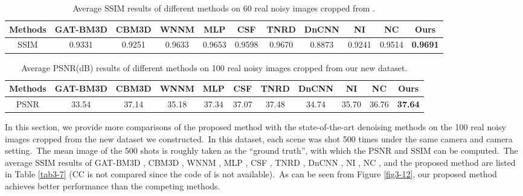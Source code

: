\begin{table}[htpb]
\begin{adjustwidth}{-1cm}{}
\scriptsize
\caption{Average SSIM \cite{ssim} results of different methods on 60 real noisy images cropped from \cite{crosschannel2016}.}
\label{tab3-5}
\begin{center}
\renewcommand\arraystretch{1}
\begin{tabular}{|c||c|c|c|c|c|c|c|c|c|c|}
\hline
Methods
&\textbf{GAT-BM3D}
&\textbf{CBM3D}
&\textbf{WNNM}
&\textbf{MLP}
&\textbf{CSF} 
&\textbf{TNRD} 
&\textbf{DnCNN}
&\textbf{NI} 
&\textbf{NC} 
&\textbf{Ours} 
\\
\hline
SSIM  
& 0.9331 & 0.9251 & 0.9633 & 0.9653 & 0.9598 & 0.9670 & 0.8873 & 0.9241 & 0.9514 & \textbf{0.9691}
\\
\hline
\end{tabular}
\end{center}
\end{adjustwidth}
\end{table}




\begin{table}
\begin{adjustwidth}{-2cm}{}
\scriptsize
\caption{Average PSNR(dB) results of different methods on 100 real noisy images cropped from our new dataset.}

\label{tab3-6}
\begin{center}
\renewcommand\arraystretch{1}
\begin{tabular}{|c||c|c|c|c|c|c|c|c|c|c|}
\hline
Methods
&\textbf{GAT-BM3D}
&\textbf{CBM3D}
&\textbf{WNNM}
&\textbf{MLP}
&\textbf{CSF} 
&\textbf{TNRD} 
&\textbf{DnCNN}
&\textbf{NI} 
&\textbf{NC} 
&\textbf{Ours} 
\\
\hline
PSNR  
& 33.54 & 37.14 & 35.18 & 37.34 & 37.07 & 37.48 & 34.74 & 35.70 & 36.76 & \textbf{37.64}
\\
\hline
\end{tabular}
\end{center}
\end{adjustwidth}
\end{table}

In this section, we provide more comparisons of the proposed method with the state-of-the-art denoising methods on the 100 real noisy images cropped from the new dataset we constructed.\ In this dataset, each scene was shot 500 times under the same camera and camera setting.\ The mean image of the 500 shots is roughly taken as the ``ground truth'', with which the PSNR and SSIM can be computed.\ The average  SSIM results of GAT-BM3D \cite{makitalo2013optimal}, CBM3D \cite{bm3d}, WNNM \cite{wnnm}, MLP \cite{mlp}, CSF \cite{csf}, TNRD \cite{tnrd}, DnCNN \cite{dncnn}, NI \cite{neatimage}, NC \cite{noiseclinic,ncwebsite}, and the proposed method are listed in Table \ref{tab3-7} (CC is not compared since the code of \cite{crosschannel2016} is not available).\ As can be seen from Figure \ref{fig3-12}, our proposed method achieves better performance than the competing methods.


